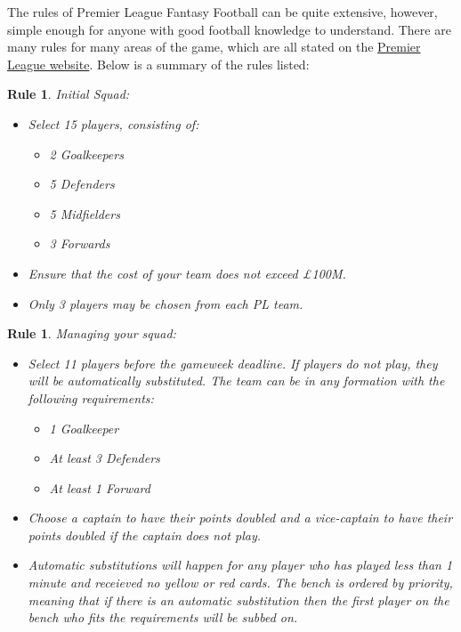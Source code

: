 \documentclass[12pt, a4paper, oneside]{book}
\newtheorem{rules}[theorem]{Rule}
\numberwithin{equation}{section}
\begin{document}
The rules of Premier League Fantasy Football can be quite extensive, however, simple enough for anyone with good football knowledge to understand. There are many rules for many areas of the game, which are all stated on the \href{https://fantasy.premierleague.com/help/rules}{Premier League website}.
\linebreak
\linebreak
Below is a summary of the rules listed:

\begin{rules} \label{initial squad rules}
  Initial Squad:
  \begin{itemize}
    \item Select 15 players, consisting of:
    \begin{itemize}
      \item 2 Goalkeepers
      \item 5 Defenders
      \item 5 Midfielders
      \item 3 Forwards
    \end{itemize}
    \item Ensure that the cost of your team does not exceed £100M.
    \item Only 3 players may be chosen from each PL team.
  \end{itemize}
\end{rules}

\begin{rules} \label{managing your squad rules}
  Managing your squad:
  \begin{itemize}
    \item Select 11 players before the gameweek deadline. If players do not play, they will be automatically substituted. The team can be in any formation with the following requirements:
    \begin{itemize}
      \item 1 Goalkeeper
      \item At least 3 Defenders
      \item At least 1 Forward
    \end{itemize}
    \item Choose a captain to have their points doubled and a vice-captain to have their points doubled if the captain does not play.
    \item Automatic substitutions will happen for any player who has played less than 1 minute and receieved no yellow or red cards. The bench is ordered by priority, meaning that if there is an automatic substitution then the first player on the bench who fits the requirements will be subbed on.
  \end{itemize}
\end{rules}
\end{document}
